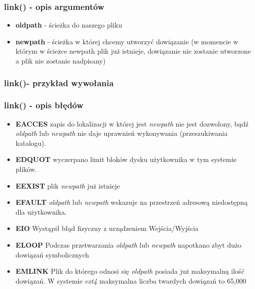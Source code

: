 \documentclass{beamer}
\begin{document}
\begin{frame}
	\frametitle{link() - opis argumentów}
\begin{itemize}
\item \textbf{oldpath} - ścieżka do naszego pliku
\item \textbf{newpath} - ścieżka w której chcemy utworzyć dowiązanie (w momencie w którym w ścieżce newpath plik już istnieje, dowiązanie nie zostanie utworzone a plik nie zostanie nadpisany)
\end{itemize}
\end{frame}

\begin{frame}
\frametitle{link()- przykład wywołania}
\lstlink
\end{frame}

\begin{frame}
	\frametitle{link() - opis błędów}
\begin{itemize}
\item \textbf{EACCES} zapis do lokalizacji w której jest \textit{newpath} nie jest dozwolony, bądź \textit{oldpath} lub \textit{newpath} nie daje uprawnień wykonywania (przeszukiwania katalogu).
\item \textbf{EDQUOT} wyczerpano limit bloków dysku użytkownika w tym systemie plików.
\item \textbf{EEXIST} plik \textit{newpath} już istnieje
\item \textbf{EFAULT} \textit{oldpath} lub \textit{newpath} wskazuje na przestrzeń adresową niedostępną dla użytkownika.
\item \textbf{EIO} Wystąpił błąd fizyczny z urządzeniem Wejścia/Wyjścia
\item \textbf{ELOOP} Podczas przetwarzania \textit{oldpath} lub \textit{newpath} napotkano zbyt dużo dowiązań symbolicznych
\item \textbf{EMLINK} Plik do którego odnosi się \textit{oldpath} posiada już maksymalną ilość dowiązań. W systemie \textit{ext4} maksymalna liczba twardych dowiązań to 65,000 
\end{itemize}
\end{frame}
\end{document}

